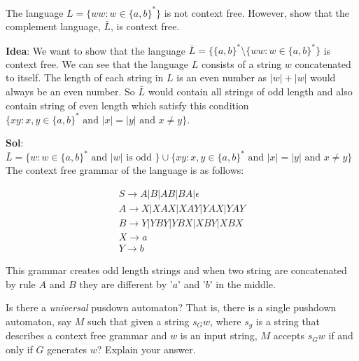 \documentclass[12pt]{exam}
\begin{document}
\begin{questions}
  \question{}
  The language $L=\{ww: w\in \{a,b\}^{*}\}$ is not context free. However, show that the complement language, $\bar{L}$, is context free.

  \begin{solution}

    \textbf{Idea}: We want to show that the language $\bar{L} = \{\{a,b\}^{*}\setminus \{ww: w\in \{a,b\}^{*}\}$ is context free. We can see that the language $L$ consists of a string $w$ concatenated to itself.
    The length of each string in $L$ is an even number as $|w| + |w|$ would always be an even number. So $\bar{L}$ would contain all strings of odd length and also contain string of even length which satisfy this condition $\{xy: x,y\in \{a,b\}^{*} \text{ and } |x|=|y| \text{ and } x\neq y\}$.

    \textbf{Sol}: $\bar{L} = \{w: w\in \{a,b\}^{*} \text{ and } |w| \text{ is odd }\} \cup \{xy: x,y\in \{a,b\}^{*} \text{ and } |x|=|y| \text{ and } x\neq y\}$ The context free grammar of the language is as follows:

    \begin{gather*}
      S\to A|B|AB|BA|\epsilon\\
      A\to X|XAX|XAY|YAX|YAY\\
      B\to Y|YBY|YBX|XBY|XBX\\
      X\to a\\
      Y\to b
    \end{gather*}

    This grammar creates odd length strings and when two string are concatenated by rule $A$ and $B$ they are different by '$a$' and '$b$' in the middle.

  \end{solution}
  \question{}
  Is there a \emph{universal} pusdown automaton? That is, there is a single pushdown automaton, say $M$ such that given a string $s_{G}w$, where $s_{g}$ is a string that describes a context free grammar and $w$ is an input string, $M$ accepts $s_{G}w$ if and only if $G$ generates $w$? Explain your answer.
\end{questions}
\end{document}
